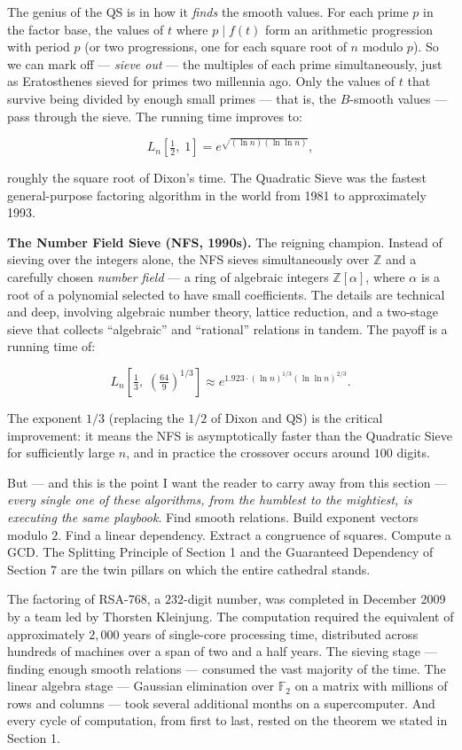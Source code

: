 The genius of the QS is in how it \emph{finds} the smooth values. For each prime \(p\) in the factor base, the values of \(t\) where \(p \mid f(t)\) form an arithmetic progression with period \(p\) (or two progressions, one for each square root of \(n\) modulo \(p\)). So we can mark off --- \emph{sieve out} --- the multiples of each prime simultaneously, just as Eratosthenes sieved for primes two millennia ago. Only the values of \(t\) that survive being divided by enough small primes --- that is, the \(B\)-smooth values --- pass through the sieve. The running time improves to:

\[L_n\!\left[\tfrac{1}{2}, \; 1\right] = e^{\sqrt{(\ln n)(\ln \ln n)}},\]

roughly the square root of Dixon's time. The Quadratic Sieve was the fastest general-purpose factoring algorithm in the world from 1981 to approximately 1993.

\textbf{The Number Field Sieve (NFS, 1990s).} The reigning champion. Instead of sieving over the integers alone, the NFS sieves simultaneously over \(\mathbb{Z}\) and a carefully chosen \emph{number field} --- a ring of algebraic integers \(\mathbb{Z}[\alpha]\), where \(\alpha\) is a root of a polynomial selected to have small coefficients. The details are technical and deep, involving algebraic number theory, lattice reduction, and a two-stage sieve that collects ``algebraic'' and ``rational'' relations in tandem. The payoff is a running time of:

\[L_n\!\left[\tfrac{1}{3}, \; \left(\tfrac{64}{9}\right)^{\!1/3}\right] \approx e^{1.923 \cdot (\ln n)^{1/3} (\ln \ln n)^{2/3}}.\]

The exponent \(1/3\) (replacing the \(1/2\) of Dixon and QS) is the critical improvement: it means the NFS is asymptotically faster than the Quadratic Sieve for sufficiently large \(n\), and in practice the crossover occurs around \(100\) digits.

But --- and this is the point I want the reader to carry away from this section --- \emph{every single one of these algorithms, from the humblest to the mightiest, is executing the same playbook}. Find smooth relations. Build exponent vectors modulo \(2\). Find a linear dependency. Extract a congruence of squares. Compute a GCD. The Splitting Principle of Section 1 and the Guaranteed Dependency of Section 7 are the twin pillars on which the entire cathedral stands.

The factoring of RSA-768, a \(232\)-digit number, was completed in December 2009 by a team led by Thorsten Kleinjung. The computation required the equivalent of approximately \(2{,}000\) years of single-core processing time, distributed across hundreds of machines over a span of two and a half years. The sieving stage --- finding enough smooth relations --- consumed the vast majority of the time. The linear algebra stage --- Gaussian elimination over \(\mathbb{F}_2\) on a matrix with millions of rows and columns --- took several additional months on a supercomputer. And every cycle of computation, from first to last, rested on the theorem we stated in Section 1.


